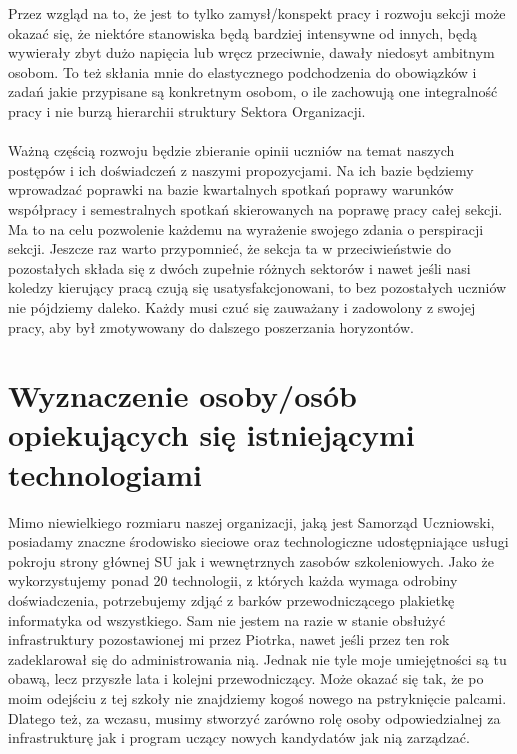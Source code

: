 \documentclass[9pt,a4paper]{report}
\begin{document}
 

Przez wzgląd na to, że jest to tylko zamysł/konspekt pracy i rozwoju sekcji może okazać się, że niektóre stanowiska będą bardziej intensywne od innych, będą wywierały zbyt dużo napięcia lub wręcz przeciwnie, dawały niedosyt ambitnym osobom. To też skłania mnie do elastycznego podchodzenia do obowiązków i zadań jakie przypisane są konkretnym osobom, o ile zachowują one integralność pracy i nie burzą hierarchii struktury Sektora Organizacji.\\\\ 

 

Ważną częścią rozwoju będzie zbieranie opinii uczniów na temat naszych postępów i ich doświadczeń z naszymi propozycjami. Na ich bazie będziemy wprowadzać poprawki na bazie kwartalnych spotkań poprawy warunków współpracy i semestralnych spotkań skierowanych na poprawę pracy całej sekcji. Ma to na celu pozwolenie każdemu na wyrażenie swojego zdania o perspiracji sekcji. Jeszcze raz warto przypomnieć, że sekcja ta w przeciwieństwie do pozostałych składa się z dwóch zupełnie różnych sektorów i nawet jeśli nasi koledzy kierujący pracą czują się usatysfakcjonowani, to bez pozostałych uczniów nie pójdziemy daleko. Każdy musi czuć się zauważany i zadowolony z swojej pracy, aby był zmotywowany do dalszego poszerzania horyzontów.\\ 

 

\section{Wyznaczenie osoby/osób opiekujących się istniejącymi technologiami} 

\label{section:my} 

Mimo niewielkiego rozmiaru naszej organizacji, jaką jest Samorząd Uczniowski, posiadamy znaczne środowisko sieciowe oraz technologiczne udostępniające usługi pokroju strony głównej SU jak i wewnętrznych zasobów szkoleniowych. Jako że wykorzystujemy ponad 20 technologii, z których każda wymaga odrobiny doświadczenia, potrzebujemy zdjąć z barków przewodniczącego plakietkę informatyka od wszystkiego. Sam nie jestem na razie w stanie obsłużyć infrastruktury pozostawionej mi przez Piotrka, nawet jeśli przez ten rok zadeklarował się do administrowania nią. Jednak nie tyle moje umiejętności są tu obawą, lecz przyszłe lata i kolejni przewodniczący. Może okazać się tak, że po moim odejściu z tej szkoły nie znajdziemy kogoś nowego na pstryknięcie palcami. Dlatego też, za wczasu, musimy stworzyć zarówno rolę osoby odpowiedzialnej za infrastrukturę jak i program uczący nowych kandydatów jak nią zarządzać.\\\\ 
\end{document}
